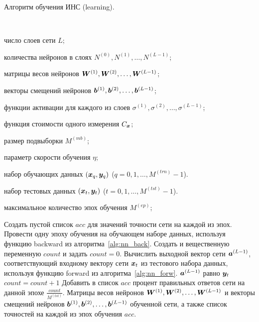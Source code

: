 \documentclass[a4paper,12pt,russian]{article} %
\begin{document}
\begin{algorithm}[t]
	\caption{
		Алгоритм обучения ИНС (learning).
	} \label{alg:nn_learning}
	\begin{algorithmic}[1]
    	\Require $\;$
    	
    		число слоев сети $L$;
    		
    		количества нейронов в слоях $N^{(0)}, N^{(1)}, \ldots, N^{(L-1)}$;
    		
    		матрицы весов нейронов $\bm{W}^{(1)}, \bm{W}^{(2)}, \ldots, \bm{W}^{(L-1)}$;
    		
    		векторы смещений нейронов $\bm{b}^{(1)}, \bm{b}^{(2)}, \ldots, \bm{b}^{(L-1)}$;

    		функции активации для каждого из слоев $\sigma^{(1)}, \sigma^{(2)}, \ldots, \sigma^{(L-1)}$;
    		
    		функция стоимости одного измерения $C_{\bm{x}}$;
    		
			размер подвыборки $M^{(mb)}$;
			
			параметр скорости обучения $\eta$;

    		набор обучающих данных $(\bm{x}_{q}, \bm{y}_{q})$ ($q= 0, 1, \ldots, M^{(trn)}-1$).
    		
    		набор тестовых данных $(\bm{x}_{t}, \bm{y}_{t})$ ($t= 0, 1, \ldots, M^{(tst)}-1$).
    		
   			максимальное количество эпох обучения $M^{(ep)}$;
   			
		\State Создать пустой список $acc$ для значений точности сети на каждой из эпох.
			\State Провести одну эпоху обучения на обучающем наборе данных, используя функцию backward из алгоритма~\ref{alg:nn_back}.
			\State Создать и вещественную переменную $count$ и задать $count=0$.
				\State Вычислить выходной вектор сети $\bm{a}^{(L-1)}$, соответствующий входному вектору сети $\bm{x}_{t}$ из тестового набора данных, используя функцию forward из алгоритма~\ref{alg:nn_forw}.
				\If $\bm{a}^{(L-1)}$ равно  $\bm{y}_{t}$
					$count = count + 1$ 
				\EndIf
			\EndFor
			\State Добавить в список $acc$ процент правильных ответов сети на данной эпохе $\frac{count}{M^{(tst)}}$.
		\EndFor
		\Ensure Матрицы весов нейронов $\bm{W}^{(1)}, \bm{W}^{(2)}, \ldots, \bm{W}^{(L-1)}$ и векторы смещений нейронов $\bm{b}^{(1)}, \bm{b}^{(2)}, \ldots, \bm{b}^{(L-1)}$ обученной сети, а также список точностей на каждой из эпох обучения $acc$.
	\end{algorithmic}
\end{algorithm}
\end{document}
